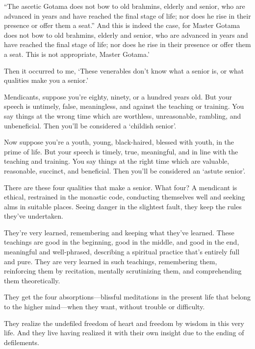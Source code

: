 \documentclass[12pt,openany]{book}%
\begin{document}
“The ascetic Gotama does not bow to old brahmins, elderly and senior, who are advanced in years and have reached the final stage of life; nor does he rise in their presence or offer them a seat.” And this is indeed the case, for Master Gotama does not bow to old brahmins, elderly and senior, who are advanced in years and have reached the final stage of life; nor does he rise in their presence or offer them a seat. This is not appropriate, Master Gotama.’ 

Then it occurred to me, ‘These venerables don’t know what a senior is, or what qualities make you a senior.’ 

Mendicants, suppose you’re eighty, ninety, or a hundred years old. But your speech is untimely, false, meaningless, and against the teaching or training. You say things at the wrong time which are worthless, unreasonable, rambling, and unbeneficial. Then you’ll be considered a ‘childish senior’. 

Now suppose you’re a youth, young, black-haired, blessed with youth, in the prime of life. But your speech is timely, true, meaningful, and in line with the teaching and training. You say things at the right time which are valuable, reasonable, succinct, and beneficial. Then you’ll be considered an ‘astute senior’. 

There are these four qualities that make a senior. What four? A mendicant is ethical, restrained in the monastic code, conducting themselves well and seeking alms in suitable places. Seeing danger in the slightest fault, they keep the rules they’ve undertaken. 

They’re very learned, remembering and keeping what they’ve learned. These teachings are good in the beginning, good in the middle, and good in the end, meaningful and well-phrased, describing a spiritual practice that’s entirely full and pure. They are very learned in such teachings, remembering them, reinforcing them by recitation, mentally scrutinizing them, and comprehending them theoretically. 

They get the four absorptions—blissful meditations in the present life that belong to the higher mind—when they want, without trouble or difficulty. 

They realize the undefiled freedom of heart and freedom by wisdom in this very life. And they live having realized it with their own insight due to the ending of defilements. 
\end{document}
